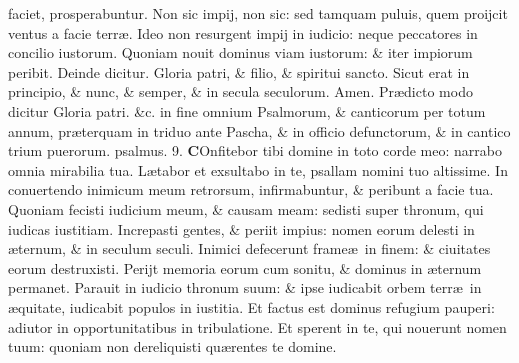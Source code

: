 \documentclass[a5paper,10pt]{book}
\def\ae{æ}
\begin{document}
\begin{multicols*}{2}
faciet, prosperabuntur.
\newline \color{red} N\color{black}on sic impij, non sic: sed tamquam puluis, quem proijcit ventus a facie terr\ae .
\newline \color{red} I\color{black}deo non resurgent impij in iudicio: neque peccatores in concilio iustorum.
\newline \color{red} Q\color{black}uoniam nouit dominus viam iustorum: \& iter impiorum peribit.
\color{red} \quad Deinde dicitur. \color{black}
\newline \color{red} G\color{black}loria patri, \& filio, \& spiritui sancto.
\newline \color{red} S\color{black}icut erat in principio, \& nunc, \& semper, \& in secula seculorum. Amen. %
\newline
\color{red} Pr\ae dicto modo dicitur \color{black} Gloria patri. \color{red} \&c. in fine omnium Psalmorum, \& canticorum per totum annum, pr\ae terquam in triduo ante Pascha, \& in officio defunctorum, \& in cantico trium puerorum. \quad psalmus. 9. \color{black}
\lettrine[lines=2]{\bfseries \color{red} C}{}Onfitebor tibi domine in toto corde meo: narrabo omnia mirabilia tua.
\newline \color{red} L\color{black}\ae tabor et exsultabo in te, psallam nomini tuo altissime.
\newline \color{red} I\color{black}n conuertendo inimicum meum retrorsum, infirmabuntur, \& peribunt a facie tua.
\newline \color{red} Q\color{black}uoniam fecisti iudicium meum, \& causam meam: sedisti super thronum, qui iudicas iustitiam.
\newline \color{red} I\color{black}ncrepasti gentes, \& periit impius: nomen eorum delesti in \ae ternum, \& in seculum seculi.
\newline \color{red} I\color{black}nimici defecerunt frame\ae \ in finem: \& ciuitates eorum destruxisti.
\newline \color{red} P\color{black}erijt memoria eorum cum sonitu, \& dominus in \ae ternum permanet.
\newline \color{red} P\color{black}arauit in iudicio thronum suum: \& ipse iudicabit orbem terr\ae \ in \ae quitate, iudicabit populos in iustitia.
\newline \color{red} E\color{black}t factus est dominus refugium pauperi: adiutor in opportunitatibus in tribulatione.
\newline \color{red} E\color{black}t sperent in te, qui nouerunt nomen tuum: quoniam non dereliquisti qu\ae rentes te domine.

\end{multicols*}
\end{document}
